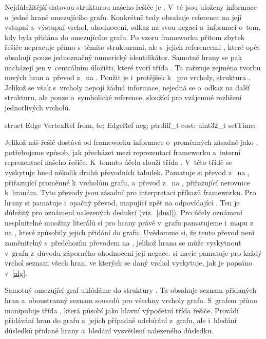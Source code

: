 Nejdůležitější datovou strukturou našeho řešiče je . V~té jsou uloženy informace o~jedné hraně omezujícího grafu. Konkrétně tedy obsahuje reference na její vstupní a~výstupní vrchol, ohodnocení, odkaz na svou negaci a~informaci o~tom, kdy byla přidána do omezujícího grafu. Po vzoru frameworku přitom zbytek řešiče nepracuje přímo s~těmito strukturami, ale s~jejich referencemi , které opět obsahují pouze jednoznačný numerický identifikátor. Samotné hrany se pak nacházejí jen v~centrálním úložišti, které tvoří třída . Ta zařizuje zejména tvorbu nových hran a~převod z~ na . Použit je i~protějšek k~ pro vrcholy, struktura . Jelikož se však s~vrcholy nepojí žádná informace, nejedná se o~odkaz na další strukturu, ale pouze o~symbolické reference, sloužící pro vzájemné rozlišení jednotlivých vrcholů.

\begin{code}[label=Deklarace struktury Edge]
struct Edge {
    VertexRef from, to;    
    EdgeRef neg;           
    ptrdiff_t cost;
    uint32_t setTime;
}
\end{code}

Jelikož náš řešič dostává od frameworku informace o~proměnných zásadně jako , potřebujeme způsob, jak přecházet mezi reprezentací frameworku a~interní reprezentací našeho řešiče. K~tomuto účelu slouží třída . V~této třídě se vyskytuje hned několik druhů převodních tabulek. Pamatuje si převod z~ na , přiřazující proměnné k~vrcholům grafu, a~převod z~ na , přiřazující nerovnice k~hranám. Tyto převody jsou zásadní pro interpretaci příkazů frameworku. Pro hrany si pamatuje i~opačný převod, mapující  zpět na odpovídající . Ten je důležitý pro oznámení nalezených dedukcí (viz.~\ref{dusl}). Pro účely oznámení nesplnitelné množiny literálů si pro hrany právě v~grafu pamatujeme i~mapu z~ na , které způsobily jejich přidání do grafu. Uvědomme si, že tento převod není zaměnitelný s~předchozím převodem na , jelikož hrana se může vyskytnout v~grafu z~důvodu záporného ohodnocení její negace.  si navíc pamatuje pro každý vrchol seznam všech hran, ve kterých se daný vrchol vyskytuje, jak je popsáno v~\ref{alg}.

Samotný omezující graf ukládáme do struktury . Ta obsahuje seznam přidaných hran a~oboustranný seznam sousedů pro všechny vrcholy grafu. S~grafem přímo manipuluje třída , která působí jako hlavní výpočetní třída řešiče. Provádí přidávání hran do grafu a~jejich případné odebírání z~grafu, ale i~hledání důsledků přidané hrany a~hledání vysvětlení nalezeného důsledku.


